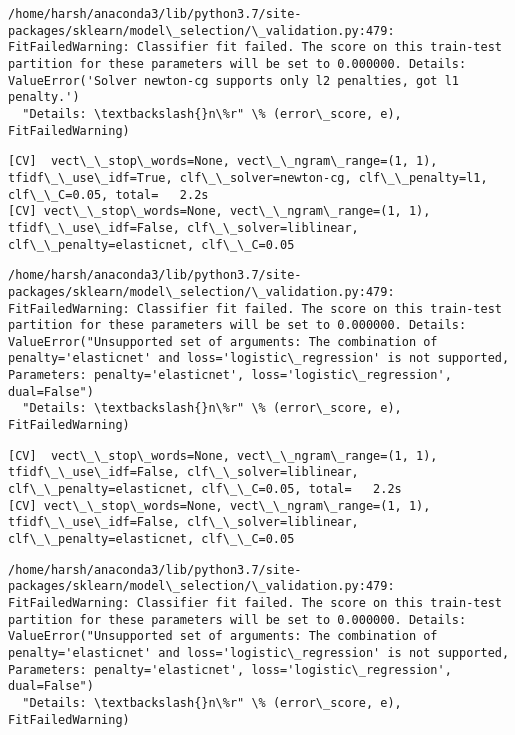 \documentclass[11pt]{article}
\begin{document}
    \begin{Verbatim}[commandchars=\\\{\}]
/home/harsh/anaconda3/lib/python3.7/site-packages/sklearn/model\_selection/\_validation.py:479: FitFailedWarning: Classifier fit failed. The score on this train-test partition for these parameters will be set to 0.000000. Details: 
ValueError('Solver newton-cg supports only l2 penalties, got l1 penalty.')
  "Details: \textbackslash{}n\%r" \% (error\_score, e), FitFailedWarning)

    \end{Verbatim}

    \begin{Verbatim}[commandchars=\\\{\}]
[CV]  vect\_\_stop\_words=None, vect\_\_ngram\_range=(1, 1), tfidf\_\_use\_idf=True, clf\_\_solver=newton-cg, clf\_\_penalty=l1, clf\_\_C=0.05, total=   2.2s
[CV] vect\_\_stop\_words=None, vect\_\_ngram\_range=(1, 1), tfidf\_\_use\_idf=False, clf\_\_solver=liblinear, clf\_\_penalty=elasticnet, clf\_\_C=0.05 

    \end{Verbatim}

    \begin{Verbatim}[commandchars=\\\{\}]
/home/harsh/anaconda3/lib/python3.7/site-packages/sklearn/model\_selection/\_validation.py:479: FitFailedWarning: Classifier fit failed. The score on this train-test partition for these parameters will be set to 0.000000. Details: 
ValueError("Unsupported set of arguments: The combination of penalty='elasticnet' and loss='logistic\_regression' is not supported, Parameters: penalty='elasticnet', loss='logistic\_regression', dual=False")
  "Details: \textbackslash{}n\%r" \% (error\_score, e), FitFailedWarning)

    \end{Verbatim}

    \begin{Verbatim}[commandchars=\\\{\}]
[CV]  vect\_\_stop\_words=None, vect\_\_ngram\_range=(1, 1), tfidf\_\_use\_idf=False, clf\_\_solver=liblinear, clf\_\_penalty=elasticnet, clf\_\_C=0.05, total=   2.2s
[CV] vect\_\_stop\_words=None, vect\_\_ngram\_range=(1, 1), tfidf\_\_use\_idf=False, clf\_\_solver=liblinear, clf\_\_penalty=elasticnet, clf\_\_C=0.05 

    \end{Verbatim}

    \begin{Verbatim}[commandchars=\\\{\}]
/home/harsh/anaconda3/lib/python3.7/site-packages/sklearn/model\_selection/\_validation.py:479: FitFailedWarning: Classifier fit failed. The score on this train-test partition for these parameters will be set to 0.000000. Details: 
ValueError("Unsupported set of arguments: The combination of penalty='elasticnet' and loss='logistic\_regression' is not supported, Parameters: penalty='elasticnet', loss='logistic\_regression', dual=False")
  "Details: \textbackslash{}n\%r" \% (error\_score, e), FitFailedWarning)

    \end{Verbatim}
\end{document}
